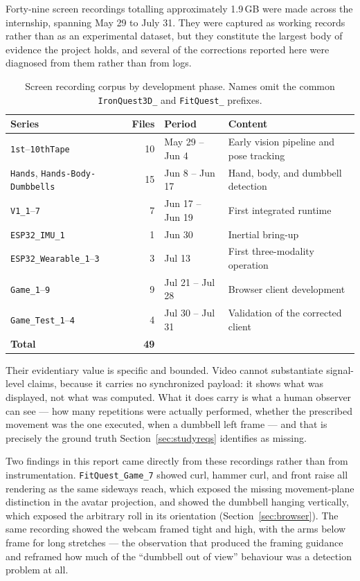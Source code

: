 \documentclass[11pt,a4paper]{article}
\newcommand{\code}[1]{\texttt{\small #1}}
\begin{document}
Forty-nine screen recordings totalling approximately 1.9\,GB were made across
the internship, spanning May 29 to July 31. They were captured as working
records rather than as an experimental dataset, but they constitute the largest
body of evidence the project holds, and several of the corrections reported here
were diagnosed from them rather than from logs.

\begin{table}[H]
\centering
\small
\caption{Screen recording corpus by development phase. Names omit the common
\code{IronQuest3D\_} and \code{FitQuest\_} prefixes.}
\label{tab:recordings}
\begin{tabularx}{\textwidth}{@{}L{4.2cm} r L{2.4cm} Y@{}}
\toprule
\textbf{Series} & \textbf{Files} & \textbf{Period} & \textbf{Content} \\
\midrule
\code{1st}--\code{10thTape} & 10 & May 29 -- Jun 4 & Early vision pipeline and pose tracking \\
\code{Hands}, \code{Hands-Body-Dumbbells} & 15 & Jun 8 -- Jun 17 & Hand, body, and dumbbell detection \\
\code{V1\_1}--\code{7} & 7 & Jun 17 -- Jun 19 & First integrated runtime \\
\code{ESP32\_IMU\_1} & 1 & Jun 30 & Inertial bring-up \\
\code{ESP32\_Wearable\_1}--\code{3} & 3 & Jul 13 & First three-modality operation \\
\code{Game\_1}--\code{9} & 9 & Jul 21 -- Jul 28 & Browser client development \\
\code{Game\_Test\_1}--\code{4} & 4 & Jul 30 -- Jul 31 & Validation of the corrected client \\
\midrule
\textbf{Total} & \textbf{49} & & \\
\bottomrule
\end{tabularx}
\end{table}

Their evidentiary value is specific and bounded. Video cannot substantiate
signal-level claims, because it carries no synchronized payload: it shows what
was displayed, not what was computed. What it does carry is what a human
observer can see --- how many repetitions were actually performed, whether the
prescribed movement was the one executed, when a dumbbell left frame --- and
that is precisely the ground truth Section~\ref{sec:studyreqs} identifies as
missing.

Two findings in this report came directly from these recordings rather than from
instrumentation. \code{FitQuest\_Game\_7} showed curl, hammer curl, and front
raise all rendering as the same sideways reach, which exposed the missing
movement-plane distinction in the avatar projection, and showed the dumbbell
hanging vertically, which exposed the arbitrary roll in its orientation
(Section~\ref{sec:browser}). The same recording showed the webcam framed tight
and high, with the arms below frame for long stretches --- the observation that
produced the framing guidance and reframed how much of the ``dumbbell out of
view'' behaviour was a detection problem at all.
\end{document}
